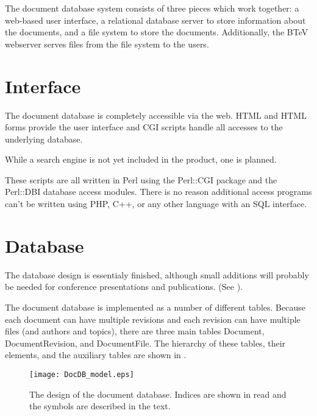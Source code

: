 \documentclass[12pt]{article}
\begin{document}
The document database system consists of three pieces which work together: a web-based
user interface, a relational database server to store information about the documents,
and a file system to store the documents. Additionally, the BTeV webserver serves
files from the file system to the users.

\section{Interface}

The document database is completely accessible via the web. HTML and HTML forms
provide the user interface and CGI scripts 
handle all accesses to the underlying database. 

While a search engine is not yet included in the product, one is planned.

These scripts are all written in Perl using the Perl::CGI package and 
the Perl::DBI database access modules. There is no reason 
additional access programs can't be written using PHP, C++, or any other 
language with an SQL interface. 

\section{Database}

The database design is essentialy finished, although small additions will
probably be needed for conference presentations and publications. (See ).

The document 
database is implemented as a number of different tables. Because each 
document can have multiple revisions and each revision can have 
multiple files (and authors and topics), there are three main tables 
Document, DocumentRevision, and DocumentFile. The hierarchy of these 
tables, their elements, and the auxiliary tables are shown in
.

\begin{figure}
\begin{center}
\texttt{[image: DocDB\_model.eps]}
\caption{The design of the document database. Indices are shown in read and the
symbols are described in the text.}
\end{center}
\end{figure}
\end{document}
